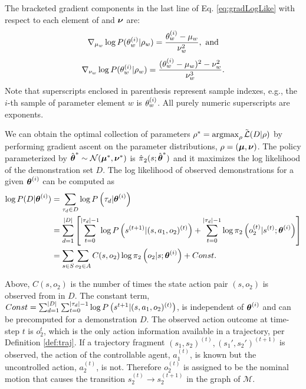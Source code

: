     \par
    The bracketed gradient components in the last line of Eq. \ref{eq:gradLogLike} with respect to each element of
    \vect{\mu} and $\boldsymbol{\mathbb{\nu}}$ are:
    \[
    \nabla_{\mu_{\paramIdx}}\log P(\paramElem^{(i)} | \rho_{\paramIdx}) =
        \frac{\paramElem^{(i)} - \mu_{\paramIdx}}{\nu_{\paramIdx}^2},\ \text{and}
    \]
    \[
    \nabla_{\nu_{w}}\log P(\theta_{w}^{(i)} | \rho_{w}) = \frac{(\theta_{w}^{(i)} - \mu_{w})^2 -
        \nu_{w}^2}{\nu_{w}^3}.
    \]
    Note that superscripts enclosed in parenthesis represent sample indexes, e.g., the $i$-th sample of parameter
    element $w$ is $\theta_{w}^{(i)}$. All purely numeric superscripts are exponents.

    We can obtain the optimal collection of parameters $\rho^*= \mathop{\mathrm{argmax}}_{\rho} \tilde{\mathcal{L}{}}(D|\rho)$ by
    performing gradient ascent on the parameter distributions, $\rho = (\boldsymbol{\mathbb{\mu}}, \boldsymbol{\mathbb{\nu}})$. The policy
    parameterized by $\hat{\boldsymbol{\mathbb{\theta}}}^* \sim \mathcal{N}(\boldsymbol{\mathbb{\mu}}^*, \boldsymbol{\mathbb{\nu}}^*)$ is
    $\hat{\pi_{}}_{2}(s; \hat{\boldsymbol{\mathbb{\theta}}}^*)$ and it maximizes the log likelihood of the
    demonstration set $D$. The log likelihood of observed demonstrations for a given $\boldsymbol{\mathbb{\theta}}^{(i)}$ can be computed
    as
    \begin{align}\label{eq:log_prob_demo}
        \log P(D|\boldsymbol{\mathbb{\theta}}^{(i)}) & = \sum_{\tau_d \in D} \log P\left(\tau_d |\boldsymbol{\mathbb{\theta}}^{(i)}\right)\\
        & = \sum_{d=1}^{\lvert D\rvert} \left[ \sum_{t=0}^{\lvert\tau_d\rvert-1} \log P \left(s^{(t+1)}|(s, a_1, o_2)^{(t)}\right) +
            \sum_{t=0}^{\lvert\tau_d\rvert-1} \log \pi_{2}\left(o_2^{(t)}|s^{(t)}; \boldsymbol{\mathbb{\theta}}^{(i)}\right) \right]\\
        & = \sum_{s\in S}\sum_{o_2\in A} C(s, o_2) \log \pi_{2}\left(o_2|s; \boldsymbol{\mathbb{\theta}}^{(i)}\right) + Const.
    \end{align}

    Above, $C(s, o_2)$ is the number of times the state action pair $(s,o_2)$ is observed from in $D$. The constant
    term, $Const =\sum_{d=1}^{\lvert D\rvert} \sum_{t=0}^{\lvert\tau_d\rvert-1} \log P\left(s^{t+1}|(s ,a_1,o_2)^{(t)}\right)$, is
    independent of $\boldsymbol{\mathbb{\theta}}^{(i)}$ and can be precomputed for a demonstration $D$. The observed action outcome at
    time-step $t$ is $o_2^t$, which is the only action information available in a trajectory, per Definition
    \ref{def:traj}. If a trajectory fragment $(s_1, s_2)^{(t)}, (s_1', s_2')^{(t+1)}$ is observed, the action of the
    controllable agent, $a_1^{(t)}$, is known but the uncontrolled action, $a_2^{(t)}$, is not. Therefore $o_2^{(t)}$ is
    assigned to be the nominal motion that causes the transition $s_2^{(t)} \rightarrow s_2^{(t+1)}$ in the graph of
    $\mathcal{M}$.

